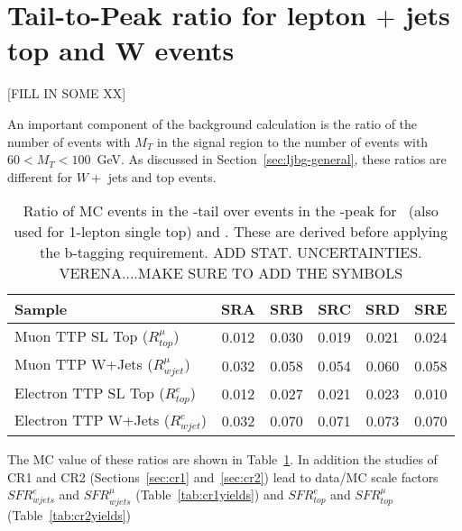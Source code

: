 \section{Tail-to-Peak ratio for lepton $+$ jets top and W events}
\label{sec:ttp}

[FILL IN SOME XX]


An important component
of the background calculation is the ratio of the number of events with $M_T$ in the signal region
to the number of events with $60 < M_T < 100$~GeV.  
As discussed in Section~\ref{sec:ljbg-general}, these ratios are different for $W +$ jets and 
top events.  



\begin{table}[!h]
\begin{center}
\begin{tabular}{l||c|c|c|c|c}
\hline
Sample              & SRA & SRB & SRC & SRD & SRE\\
\hline
\hline
Muon TTP SL Top ($R^{\mu}_{top}$)	  & 0.012  & 0.030  & 0.019  & 0.021  & 0.024  \\
Muon TTP W+Jets  ($R^{\mu}_{wjet}$)	  & 0.032  & 0.058  & 0.054  & 0.060  & 0.058  \\
\hline
\hline
Electron TTP SL Top  ($R^e_{top}$)	  & 0.012  & 0.027  & 0.021  & 0.023  & 0.010  \\
Electron TTP W+Jets  ($R^e_{wjet}$)	  & 0.032  & 0.070  & 0.071  & 0.073  & 0.070  \\
\hline
\hline
\end{tabular}
\caption{ Ratio of MC events in the \mt-tail over events in the \mt-peak for
  \ttsl\ (also used for 1-lepton single top) and \wjets. These are
  derived before applying the b-tagging requirement.  
  ADD STAT. UNCERTAINTIES.  VERENA....MAKE SURE TO ADD THE SYMBOLS
\label{tab:ttp}}
\end{center}
\end{table}

The MC value of these ratios are shown in Table~\ref{tab:ttp}.
In addition the studies of CR1 and CR2 (Sections~\ref{sec:cr1} and~\ref{sec:cr2})
lead to data/MC scale factors 
$SFR^{e}_{wjets}$ and  $SFR^{\mu}_{wjets}$ (Table~\ref{tab:cr1yields}) and
$SFR^{e}_{top}$ and  $SFR^{\mu}_{top}$ (Table~\ref{tab:cr2yields})

\clearpage